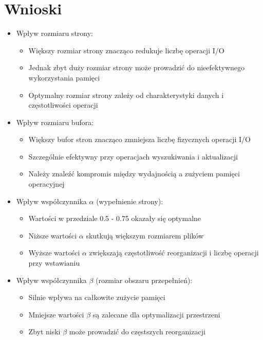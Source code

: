 \documentclass[12pt]{article}
\begin{document}
\section{Wnioski}
\begin{itemize}
    \item Wpływ rozmiaru strony:
    \begin{itemize}
        \item Większy rozmiar strony znacząco redukuje liczbę operacji I/O
        \item Jednak zbyt duży rozmiar strony może prowadzić do nieefektywnego wykorzystania pamięci
        \item Optymalny rozmiar strony zależy od charakterystyki danych i częstotliwości operacji
    \end{itemize}

    \item Wpływ rozmiaru bufora:
    \begin{itemize}
        \item Większy bufor stron znacząco zmniejsza liczbę fizycznych operacji I/O
        \item Szczególnie efektywny przy operacjach wyszukiwania i aktualizacji
        \item Należy znaleźć kompromis między wydajnością a zużyciem pamięci operacyjnej
    \end{itemize}

    \item Wpływ współczynnika $\alpha$ (wypełnienie strony):
    \begin{itemize}
        \item Wartości w przedziale 0.5 - 0.75 okazały się optymalne
        \item Niższe wartości $\alpha$ skutkują większym rozmiarem plików
        \item Wyższe wartości $\alpha$ zwiększają częstotliwość reorganizacji i liczbę operacji przy wstawianiu
    \end{itemize}

    \item Wpływ współczynnika $\beta$ (rozmiar obszaru przepełnień):
    \begin{itemize}
        \item Silnie wpływa na całkowite zużycie pamięci
        \item Mniejsze wartości $\beta$ są zalecane dla optymalizacji przestrzeni
        \item Zbyt niski $\beta$ może prowadzić do częstszych reorganizacji
    \end{itemize}


\end{itemize}
\end{document}
